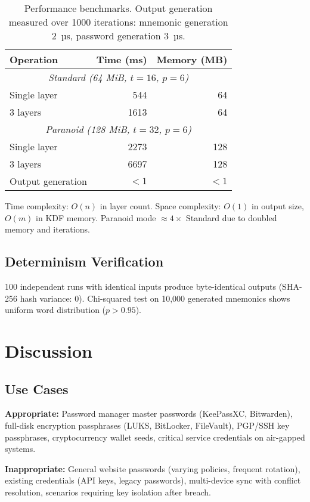 \documentclass[11pt]{article}
\begin{document}
\begin{table}[H]
\centering
\begin{tabular}{@{}lrr@{}}
\toprule
\textbf{Operation} & \textbf{Time (ms)} & \textbf{Memory (MB)} \\
\midrule
\multicolumn{3}{c}{\textit{Standard (64 MiB, $t=16$, $p=6$)}} \\
Single layer & 544 & 64 \\
3 layers & 1613 & 64 \\
\midrule
\multicolumn{3}{c}{\textit{Paranoid (128 MiB, $t=32$, $p=6$)}} \\
Single layer & 2273 & 128 \\
3 layers & 6697 & 128 \\
\midrule
Output generation & $<1$ & $<1$ \\
\bottomrule
\end{tabular}
\caption{Performance benchmarks. Output generation measured over 1000 iterations: mnemonic generation 2~µs, password generation 3~µs.}
\end{table}

Time complexity: $O(n)$ in layer count. Space complexity: $O(1)$ in output size, $O(m)$ in KDF memory. Paranoid mode $\approx 4\times$ Standard due to doubled memory and iterations.

\subsection{Determinism Verification}

100 independent runs with identical inputs produce byte-identical outputs (SHA-256 hash variance: 0). Chi-squared test on 10,000 generated mnemonics shows uniform word distribution ($p > 0.95$).

\section{Discussion}

\subsection{Use Cases}

\textbf{Appropriate:} Password manager master passwords (KeePassXC, Bitwarden), full-disk encryption passphrases (LUKS, BitLocker, FileVault), PGP/SSH key passphrases, cryptocurrency wallet seeds, critical service credentials on air-gapped systems.

\textbf{Inappropriate:} General website passwords (varying policies, frequent rotation), existing credentials (API keys, legacy passwords), multi-device sync with conflict resolution, scenarios requiring key isolation after breach.
\end{document}
